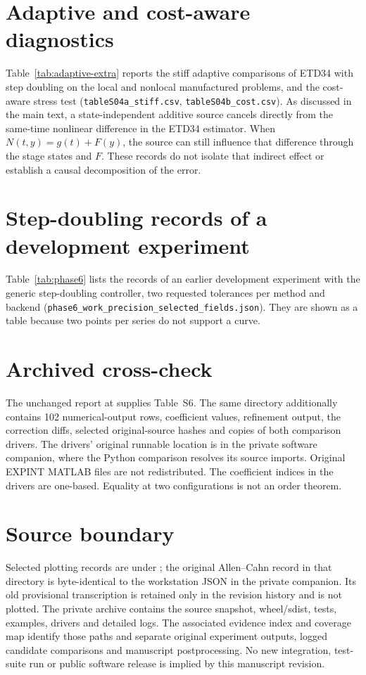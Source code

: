 \documentclass[11pt,a4paper]{article}
\begin{document}
\section*{Adaptive and cost-aware diagnostics}
Table~\ref{tab:adaptive-extra} reports the stiff adaptive comparisons of ETD34
with step doubling on the local and nonlocal manufactured problems, and the
cost-aware stress test (\texttt{tableS04a\_stiff.csv}, \texttt{tableS04b\_cost.csv}).
As discussed in the main text, a state-independent additive source
cancels directly from the same-time nonlinear difference in the ETD34
estimator.  When $N(t,y)=g(t)+F(y)$, the source can still influence that
difference through the stage states and $F$.  These records do not isolate
that indirect effect or establish a causal decomposition of the error.


\section*{Step-doubling records of a development experiment}
Table~\ref{tab:phase6} lists the records of an earlier development experiment
with the generic step-doubling controller, two requested tolerances per method
and backend (\texttt{phase6\_work\_precision\_selected\_fields.json}). They are
shown as a table because two points per series do not support a curve.


\clearpage
\section*{Archived cross-check}
The unchanged report at
 supplies
Table~S6.  The same directory additionally contains 102 numerical-output
rows, coefficient values, refinement output, the correction diffs, selected
original-source hashes and copies of both comparison drivers.  The drivers'
original runnable location is in the private software companion, where the
Python comparison resolves its source imports.  Original EXPINT MATLAB
files are not redistributed.  The coefficient indices in the drivers are
one-based.  Equality at two configurations is not an order theorem.

\clearpage

\section*{Source boundary}
Selected plotting records are under ; the
original Allen--Cahn record in that directory is byte-identical to the
workstation JSON in the private companion.  Its old provisional
transcription is retained only in the revision history and is not plotted.
The private archive  contains the
source snapshot, wheel/sdist, tests, examples, drivers and detailed logs.
The associated evidence index and coverage map identify those paths and
separate original experiment outputs, logged candidate comparisons and
manuscript postprocessing.  No new integration, test-suite run or public
software release is implied by this manuscript revision.
\end{document}
